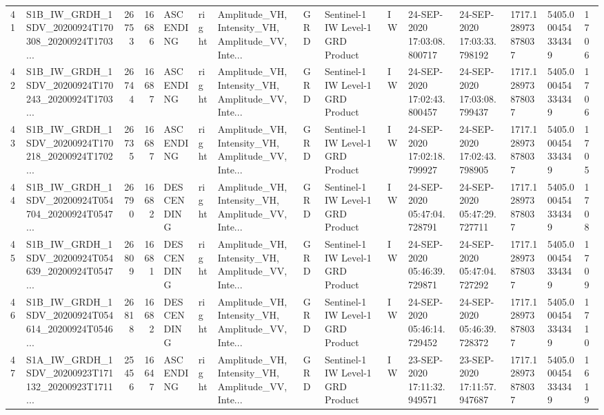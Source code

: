 \begin{tabular}{llrrlllllllllll}
41  &  S1B\_IW\_GRDH\_1SDV\_20200924T170308\_20200924T1703... &  26753 &   16686 &   ASCENDING &  right &  Amplitude\_VH, Intensity\_VH, Amplitude\_VV, Inte... &          GRD &  Sentinel-1 IW Level-1 GRD Product &              IW &  24-SEP-2020 17:03:08.800717 &  24-SEP-2020 17:03:33.798192 &          1717.128973878037 &  5405.000454334349 &       1706 \\
42  &  S1B\_IW\_GRDH\_1SDV\_20200924T170243\_20200924T1703... &  26744 &   16687 &   ASCENDING &  right &  Amplitude\_VH, Intensity\_VH, Amplitude\_VV, Inte... &          GRD &  Sentinel-1 IW Level-1 GRD Product &              IW &  24-SEP-2020 17:02:43.800457 &  24-SEP-2020 17:03:08.799437 &          1717.128973878037 &  5405.000454334349 &       1706 \\
43  &  S1B\_IW\_GRDH\_1SDV\_20200924T170218\_20200924T1702... &  26735 &   16687 &   ASCENDING &  right &  Amplitude\_VH, Intensity\_VH, Amplitude\_VV, Inte... &          GRD &  Sentinel-1 IW Level-1 GRD Product &              IW &  24-SEP-2020 17:02:18.799927 &  24-SEP-2020 17:02:43.798905 &          1717.128973878037 &  5405.000454334349 &       1705 \\
44  &  S1B\_IW\_GRDH\_1SDV\_20200924T054704\_20200924T0547... &  26790 &   16682 &  DESCENDING &  right &  Amplitude\_VH, Intensity\_VH, Amplitude\_VV, Inte... &          GRD &  Sentinel-1 IW Level-1 GRD Product &              IW &  24-SEP-2020 05:47:04.728791 &  24-SEP-2020 05:47:29.727711 &          1717.128973878037 &  5405.000454334349 &       1708 \\
45  &  S1B\_IW\_GRDH\_1SDV\_20200924T054639\_20200924T0547... &  26809 &   16681 &  DESCENDING &  right &  Amplitude\_VH, Intensity\_VH, Amplitude\_VV, Inte... &          GRD &  Sentinel-1 IW Level-1 GRD Product &              IW &  24-SEP-2020 05:46:39.729871 &  24-SEP-2020 05:47:04.727292 &          1717.128973878037 &  5405.000454334349 &       1709 \\
46  &  S1B\_IW\_GRDH\_1SDV\_20200924T054614\_20200924T0546... &  26818 &   16682 &  DESCENDING &  right &  Amplitude\_VH, Intensity\_VH, Amplitude\_VV, Inte... &          GRD &  Sentinel-1 IW Level-1 GRD Product &              IW &  24-SEP-2020 05:46:14.729452 &  24-SEP-2020 05:46:39.728372 &          1717.128973878037 &  5405.000454334349 &       1710 \\
47  &  S1A\_IW\_GRDH\_1SDV\_20200923T171132\_20200923T1711... &  25456 &   16647 &   ASCENDING &  right &  Amplitude\_VH, Intensity\_VH, Amplitude\_VV, Inte... &          GRD &  Sentinel-1 IW Level-1 GRD Product &              IW &  23-SEP-2020 17:11:32.949571 &  23-SEP-2020 17:11:57.947687 &          1717.128973878037 &  5405.000454334349 &       1619 \\

\end{tabular}
